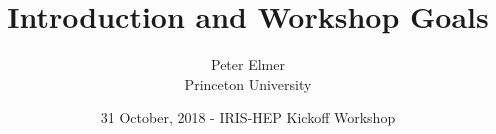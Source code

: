 \documentclass{beamer}
\title{Introduction and Workshop Goals}
\author{Peter Elmer \\ Princeton University}
\date{31 October, 2018 - IRIS-HEP Kickoff Workshop}
\begin{document}
\begin{frame}
  \titlepage
\end{frame}














\end{document}
